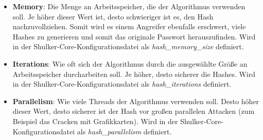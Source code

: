 \begin{itemize}
    \item \textbf{Memory}: Die Menge an Arbeitsspeicher, die der Algorithmus verwenden soll. Je höher dieser Wert ist,
    desto schwieriger ist es, den Hash nachzuvollziehen. Somit wird es einem Angreifer ebenfalls erschwert, viele Hashes zu generieren
    und somit das originale Passwort herauszufinden. Wird in der Shulker-Core-Konfigurationsdatei als \textit{hash\_memory\_size} definiert.
    \item \textbf{Iterations}: Wie oft sich der Algorithmus durch die ausgewählte Größe an Arbeitsspeicher durcharbeiten soll. Je höher, desto
    sicherer die Hashes. Wird in der Shulker-Core-Konfigurationsdatei als \textit{hash\_iterations} definiert.
    \item \textbf{Parallelism}: Wie viele Threads der Algorithmus verwenden soll. Desto höher dieser Wert, desto sicherer ist der Hash
    vor großen parallelen Attacken (zum Beispiel das Cracken mit Grafikkarten). Wird in der Shulker-Core-Konfigurationsdatei als \textit{hash\_parallelism} definiert.
\end{itemize}